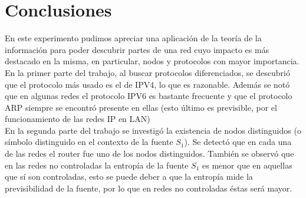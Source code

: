 \section{Conclusiones}
En este experimento pudimos apreciar una aplicación de la teoría de la información para poder descubrir partes de una red cuyo impacto es más destacado en la misma, en particular, nodos y protocolos con mayor importancia.
\\
En la primer parte del trabajo, al buscar protocolos diferenciados, se descubrió que el protocolo más usado es el de IPV4, lo que es razonable. Además se notó que en algunas redes el protocolo IPV6 es bastante frecuente y que el protocolo ARP siempre se encontró presente en ellas (esto último es previsible, por el funcionamiento de las redes IP en LAN)
\\
En la segunda parte del trabajo se investigó la existencia de nodos distinguidos (o símbolo distinguido en el contexto de la fuente $S_1$). Se detectó que en cada una de las redes el router fue uno de los nodos distinguidos. También se observó que en las redes no controladas la entropía de la fuente $S_1$ es menor que en aquellas que sí son controladas, esto se puede deber a que la entropía mide la previsibilidad de la fuente, por lo que en redes no controladas éstas será mayor.

